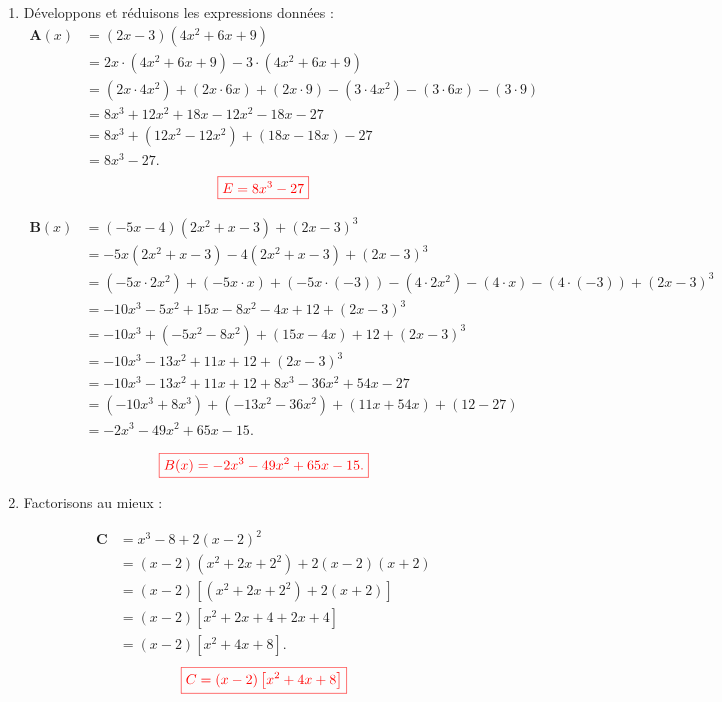 \documentclass[12pt,a4paper]{article}
\begin{document}
\begin{enumerate}
\item Développons et réduisons les expressions données :
\begin{align*}
\textbf{A}(x) &= (2x - 3)(4x^2 + 6x + 9) \\ 
  &= 2x \cdot (4x^2 + 6x + 9) - 3 \cdot (4x^2 + 6x + 9) \\ 
  &= (2x \cdot 4x^2) + (2x \cdot 6x) + (2x \cdot 9) - (3 \cdot 4x^2) - (3 \cdot 6x) - (3 \cdot 9) \\ 
  &= 8x^3 + 12x^2 + 18x - 12x^2 - 18x - 27 \\ 
  &= 8x^3 + (12x^2 - 12x^2) + (18x - 18x) - 27 \\ 
  &= 8x^3 - 27.
\end{align*}
$$\textcolor{red}{\boxed{E=8x^3 - 27}}$$

\begin{align*}
\textbf{B}(x) &= (-5x - 4)(2x^2 + x - 3) + (2x - 3)^3 \\ 
  &= -5x(2x^2 + x - 3) - 4(2x^2 + x - 3) + (2x - 3)^3 \\ 
  &= (-5x \cdot 2x^2) + (-5x \cdot x) + (-5x \cdot (-3)) - (4 \cdot 2x^2) - (4 \cdot x) - (4 \cdot (-3)) + (2x - 3)^3 \\ 
  &= -10x^3 - 5x^2 + 15x - 8x^2 - 4x + 12 + (2x - 3)^3 \\ 
  &= -10x^3 + (-5x^2 - 8x^2) + (15x - 4x) + 12 + (2x - 3)^3 \\ 
  &= -10x^3 - 13x^2 + 11x + 12 + (2x - 3)^3 \\ 
  &= -10x^3 - 13x^2 + 11x + 12 + 8x^3 - 36x^2 + 54x - 27 \\ 
  &= (-10x^3 + 8x^3) + (-13x^2 - 36x^2) + (11x + 54x) + (12 - 27) \\ 
  &= -2x^3 - 49x^2 + 65x - 15.
\end{align*}

\[
\textcolor{red}{\boxed{B(x) = -2x^3 - 49x^2 + 65x - 15.}}
\]


\item Factorisons au mieux :

\begin{align*}
\textbf{C} &= x^3 - 8 + 2(x - 2)^2 \\ 
  &= (x - 2)(x^2 + 2x + 2^2) + 2(x - 2)(x + 2) \\ 
  &= (x - 2)\left[(x^2 + 2x + 2^2) + 2(x + 2)\right] \\ 
  &= (x - 2)\left[x^2 + 2x + 4 + 2x + 4\right] \\ 
  &= (x - 2)\left[x^2 + 4x + 8\right].
\end{align*}
$$\textcolor{red}{\boxed{C=(x - 2)\left[x^2 + 4x + 8\right]}}$$


\end{enumerate}
\end{document}
